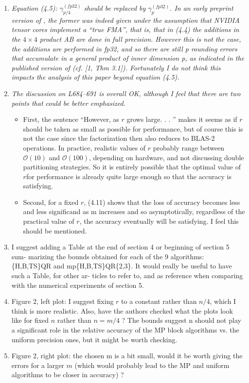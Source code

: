 \documentclass[final,onefignum,onetabnum]{siamart190516}
\newcommand{\cO}{\mathcal{O}}
\begin{document}
\begin{enumerate}
    \item {\it Equation (4.5): $\gamma_{p/4}^{(fp32)}$ should be replaced by $\gamma_p^{(fp32)}$. In an early preprint version of \cite{Blanchard2020}, the former was indeed given under the assumption that NVIDIA tensor cores implement a “true FMA”, that is, that in (4.4) the additions in the $4\times 4$ product AB are done in full precision. However this is not the case, the additions are performed in fp32, and so there are still p rounding errors that accumulate in a general product of inner dimension p, as indicated in the published version of \cite{Blanchard2020} (cf. [1, Thm 3.1]). Fortunately I do not think this impacts the analysis of this paper beyond equation (4.5).}
    \item {\it The discussion on L684–691 is overall OK, although I feel that there are two points that could be better emphasized.}
    \begin{itemize}
        \item First, the sentence “However, as $r$ grows large. . . ” makes it seems as if $r$ should be taken as small as possible for performance, but of course this is not the case since the factorization then also reduces to BLAS-2 operations. In practice, realistic values of $r$ probably range between $\cO(10)$ and $\cO(100)$, depending on hardware, and not discussing double partitioning strategies. So it is entirely possible that the optimal value of $r$for performance is already quite large enough so that the accuracy is satisfying.
        \item Second, for a fixed $r$, (4.11) shows that the loss of accuracy becomes less and less significand as m increases and so asymptotically, regardless of the practical value of $r$, the accuracy eventually will be satisfying. I feel this should be mentioned.
\end{itemize}
    \item I suggest adding a Table at the end of section 4 or beginning of section 5 sum- marizing the bounds obtained for each of the 9 algorithms: \{H,B,TS\}QR and mp\{H,B,TS\}QR\{2,3\}. It would really be useful to have such a Table, for other ar- ticles to refer to, and as reference when comparing with the numerical experiments of section 5.
    \item Figure 2, left plot: I suggest fixing $r$ to a constant rather than $n/4$, which I think is more realistic. Also, have the authors checked what the plots look like for fixed $n$ rather than $n = m/4$ ? The bounds suggest n should not play a significant role in the relative accuracy of the MP block algorithms vs. the uniform precision ones, but it might be worth checking.
    \item Figure 2, right plot: the chosen m is a bit small, would it be worth giving the errors for a larger $m$ (which would probably lead to the MP and uniform algorithms to be closer in accuracy) ?
\end{enumerate}
\end{document}
